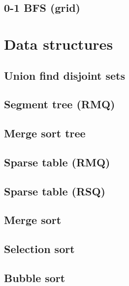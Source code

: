 \subsection{0-1 BFS (grid)}
\raggedbottom
\hrulefill


\section{Data structures}
\subsection{Union find disjoint sets}
\raggedbottom
\hrulefill
\subsection{Segment tree (RMQ)}
\raggedbottom
\hrulefill
\subsection{Merge sort tree}
\raggedbottom
\hrulefill
\subsection{Sparse table (RMQ)}
\raggedbottom
\hrulefill
\subsection{Sparse table (RSQ)}
\raggedbottom
\hrulefill
\subsection{Merge sort}
\raggedbottom
\hrulefill
\subsection{Selection sort}
\raggedbottom
\hrulefill
\subsection{Bubble sort}
\raggedbottom
\hrulefill


